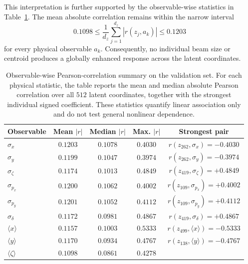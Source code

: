 This interpretation is further supported by the observable-wise
statistics in Table~\ref{tab:cvae_feature_correlation}. The mean
absolute correlation remains within the narrow interval
\[
    0.1098
    \leq
    \frac{1}{d_z}
    \sum_{j=1}^{d_z}
    \left|
        r(z_j,a_k)
    \right|
    \leq
    0.1203
\]
for every physical observable $a_k$. Consequently, no individual beam
size or centroid produces a globally enhanced response across the
latent coordinates.

\begin{table}[htbp]
    \centering
    \caption{
        Observable-wise Pearson-correlation summary on the validation set. For each physical statistic, the table reports the mean and median absolute Pearson correlation over all $512$ latent coordinates, together with the strongest individual signed coefficient. These statistics quantify linear association only and do not test general nonlinear dependence.
    }
    \label{tab:cvae_feature_correlation}
    \small
    \begin{tabular}{lcccc}
        \toprule
        Observable
        & Mean $|r|$
        & Median $|r|$
        & Max. $|r|$
        & Strongest pair \\
        \midrule
        $\sigma_x$
            & $0.1203$ & $0.1078$ & $0.4030$
            & $r(z_{262},\sigma_x)=-0.4030$ \\
        $\sigma_y$
            & $0.1199$ & $0.1047$ & $0.3974$
            & $r(z_{262},\sigma_y)=-0.3974$ \\
        $\sigma_\zeta$
            & $0.1174$ & $0.1013$ & $0.4849$
            & $r(z_{419},\sigma_\zeta)=+0.4849$ \\
        $\sigma_{p_x}$
            & $0.1200$ & $0.1062$ & $0.4002$
            & $r(z_{109},\sigma_{p_x})=+0.4002$ \\
        $\sigma_{p_y}$
            & $0.1201$ & $0.1052$ & $0.4112$
            & $r(z_{109},\sigma_{p_y})=+0.4112$ \\
        $\sigma_\delta$
            & $0.1172$ & $0.0981$ & $0.4867$
            & $r(z_{419},\sigma_\delta)=+0.4867$ \\
        $\langle x\rangle$
            & $0.1157$ & $0.1003$ & $0.5333$
            & $r(z_{499},\langle x\rangle)=-0.5333$ \\
        $\langle y\rangle$
            & $0.1170$ & $0.0934$ & $0.4767$
            & $r(z_{138},\langle y\rangle)=-0.4767$ \\
        $\langle\zeta\rangle$
            & $0.1098$ & $0.0861$ & $0.4278$

\end{tabular}
\end{table}

